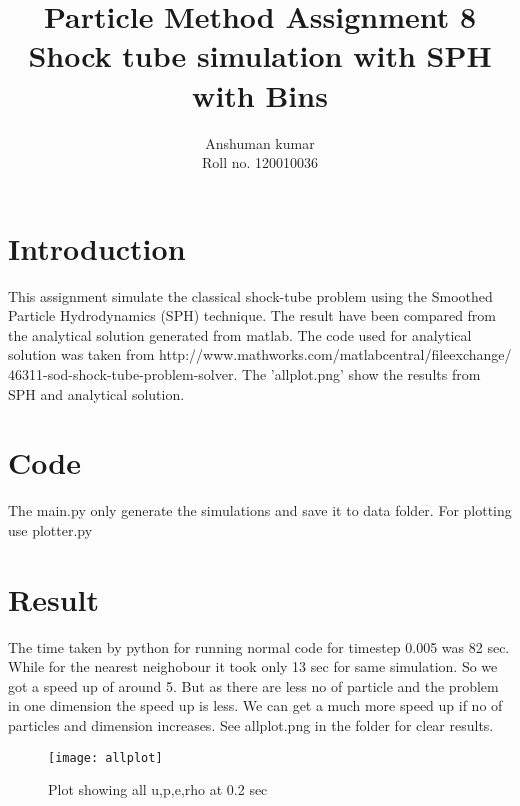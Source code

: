 \documentclass[12pt]{article}
\title {Particle Method Assignment 8 \\
Shock tube simulation with SPH with Bins}
\author {Anshuman kumar \\
Roll no.  120010036}
\begin{document}
\maketitle

\section{Introduction}
This assignment simulate the classical shock-tube problem using the
Smoothed Particle Hydrodynamics (SPH) technique. The result have been compared
from the analytical solution generated from matlab. The code used for analytical solution
was taken from
http://www.mathworks.com/matlabcentral/fileexchange/
46311-sod-shock-tube-problem-solver.
The 'allplot.png' show the results from SPH and analytical solution.

\section{Code}
The main.py only generate the simulations and save it to data folder.
For plotting use plotter.py
\section{Result}
The time taken by python for running normal code for timestep 0.005 was 82 sec. While for the nearest neighobour it took only 13 sec for same simulation. So we got a speed up of around 5. But as there are less no of particle and the problem in one dimension the speed up is less. We can get a much more speed up if no of particles and dimension increases.
See allplot.png in the folder for clear results.
\begin{figure}
    \centering
    \texttt{[image: allplot]}
    \caption{Plot showing all u,p,e,rho at 0.2 sec} 
\end{figure}
\end{document}
